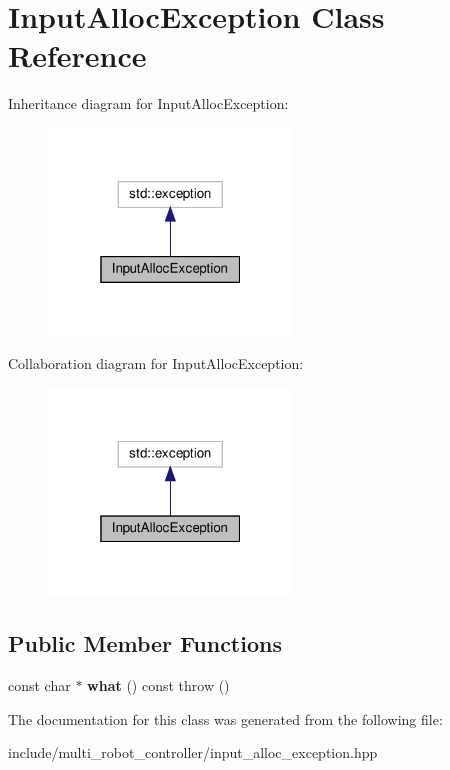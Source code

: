 \hypertarget{classInputAllocException}{}\section{Input\+Alloc\+Exception Class Reference}
\label{classInputAllocException}


Inheritance diagram for Input\+Alloc\+Exception\+:\nopagebreak
\begin{figure}[H]
\begin{center}
\leavevmode
\includegraphics[width=184pt]{d8/d37/classInputAllocException__inherit__graph}
\end{center}
\end{figure}


Collaboration diagram for Input\+Alloc\+Exception\+:\nopagebreak
\begin{figure}[H]
\begin{center}
\leavevmode
\includegraphics[width=184pt]{d5/d7d/classInputAllocException__coll__graph}
\end{center}
\end{figure}
\subsection*{Public Member Functions}
\begin{DoxyCompactItemize}
\item 
const char $\ast$ {\bfseries what} () const  throw ()
\end{DoxyCompactItemize}


The documentation for this class was generated from the following file\+:\begin{DoxyCompactItemize}
\item 
include/multi\+\_\+robot\+\_\+controller/input\+\_\+alloc\+\_\+exception.\+hpp\end{DoxyCompactItemize}
